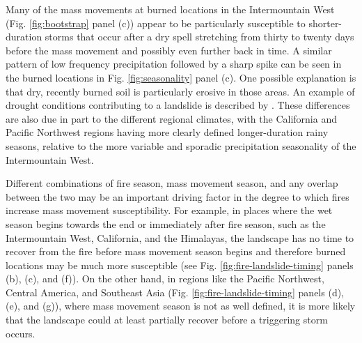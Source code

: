 \documentclass[nhess, manuscript]{copernicus}
\begin{document}
Many of the mass movements at burned locations in the Intermountain West (Fig. \ref{fig:bootstrap} panel (c)) appear to be
particularly susceptible to shorter-duration storms that occur after a
dry spell stretching from thirty to twenty days before the mass movement and
possibly even further back in time. A similar pattern of low frequency precipitation
followed by a sharp spike can be seen in the burned locations in
Fig. \ref{fig:seasonality} panel (c). One possible explanation
is that dry, recently burned soil is particularly erosive in those
areas. An example of drought conditions contributing to a landslide is described by \citep{handwerger2019shift}. These differences are also due in part to the different regional
climates, with the California and Pacific Northwest regions having more
clearly defined longer-duration rainy seasons, relative to the more
variable and sporadic precipitation seasonality of the Intermountain
West.

Different combinations of fire season, mass movement season, and any
overlap between the two may be an important driving factor in the degree
to which fires increase mass movement susceptibility. For example, in places
where the wet season begins towards the end or immediately after fire
season, such as the Intermountain West, California, and the Himalayas,
the landscape has no time to recover from the fire before mass movement
season begins and therefore burned locations may be much more
susceptible (see Fig. \ref{fig:fire-landslide-timing} panels (b), (c), 
and (f)). On the other hand, in regions like the Pacific Northwest,
Central America, and Southeast Asia (Fig. \ref{fig:fire-landslide-timing} 
panels (d), (e), and (g)), where mass movement season is not as
well defined, it is more likely that the landscape could at least
partially recover before a triggering storm occurs.
\end{document}

